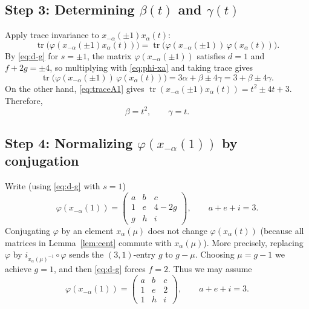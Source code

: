 \documentclass[]{jgcc}
\DeclareMathOperator{\tr}{tr}
\numberwithin{equation}{section}
\begin{document}
\subsection*{\texorpdfstring{Step 3: Determining $\beta(t)$ and $\gamma(t)$}{Step 3: Determining beta(t) and gamma(t)}}
Apply trace invariance to $x_{-\alpha}(\pm1)x_\alpha(t)$:
\[
\tr\bigl(\varphi(x_{-\alpha}(\pm1)x_\alpha(t))\bigr)
=\tr\bigl(\varphi(x_{-\alpha}(\pm1))\,\varphi(x_\alpha(t))\bigr).
\]
By \eqref{eq:d-g} for $s=\pm1$, the matrix $\varphi(x_{-\alpha}(\pm1))$ satisfies $d=1$ and $f+2g=\pm4$,
so multiplying with \eqref{eq:phi-xa} and taking trace gives
\[
\tr\bigl(\varphi(x_{-\alpha}(\pm1))\,\varphi(x_\alpha(t))\bigr)=3\alpha+\beta\pm4\gamma=3+\beta\pm4\gamma.
\]
On the other hand, \eqref{eq:traceA1} gives $\tr(x_{-\alpha}(\pm1)x_\alpha(t))=t^2\pm4t+3$.
Therefore,
\begin{equation}\label{eq:beta-gamma}
\beta=t^2,\qquad \gamma=t.
\end{equation}

\subsection*{\texorpdfstring{Step 4: Normalizing $\varphi(x_{-\alpha}(1))$ by conjugation}{Step 4: Normalizing phi(x-alpha(1)) by conjugation}}
Write (using \eqref{eq:d-g} with $s=1$)
\[
\varphi(x_{-\alpha}(1))=
\begin{pmatrix}
a& b& c\\
1& e& 4-2g\\
g& h& i
\end{pmatrix},
\qquad a+e+i=3.
\]
Conjugating $\varphi$ by an element $x_\alpha(\mu)$ does not change $\varphi(x_\alpha(t))$
(because all matrices in Lemma~\ref{lem:cent} commute with $x_\alpha(\mu)$).
More precisely, replacing $\varphi$ by $i_{x_\alpha(\mu)^{-1}}\circ \varphi$ sends the $(3,1)$-entry $g$ to $g-\mu$.
Choosing $\mu=g-1$ we achieve $g=1$, and then \eqref{eq:d-g} forces $f=2$.
Thus we may assume
\begin{equation}\label{eq:phi-x-1}
\varphi(x_{-\alpha}(1))=
\begin{pmatrix}
a& b& c\\
1& e& 2\\
1& h& i
\end{pmatrix},
\qquad a+e+i=3.
\end{equation}
\end{document}

